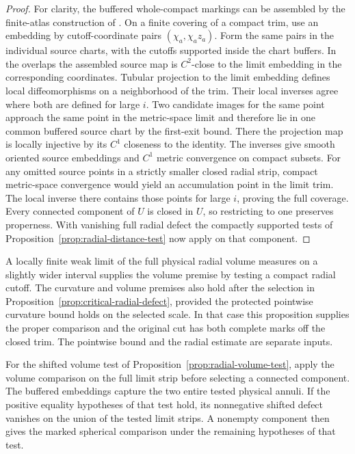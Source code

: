 \begin{proof}
For clarity, the buffered whole-compact markings can be assembled
by the finite-atlas construction of
\cite[Theorem~3.1 and its proof]{BelegradekKapovitch2000Finiteness}.
On a finite covering of a compact trim, use an embedding by
cutoff-coordinate pairs \((\chi_a,\chi_a z_a)\). Form the same pairs
in the individual source charts, with the cutoffs supported inside
the chart buffers. In the overlaps the assembled source map is
\(C^2\)-close to the limit embedding in the corresponding
coordinates. Tubular projection to the limit embedding defines
local diffeomorphisms on a neighborhood of the trim. Their local
inverses agree where both are defined for large \(i\). Two candidate
images for the same point approach the same point in the metric-space
limit and therefore lie in one common buffered source chart by the
first-exit bound. There the projection map is locally injective by
its \(C^1\) closeness to the identity. The inverses give smooth
oriented source embeddings and \(C^1\) metric convergence on compact
subsets. For any omitted source points in a strictly smaller closed
radial strip, compact metric-space convergence would yield an
accumulation point in the limit trim. The local inverse there
contains those points for large \(i\), proving the full coverage.
Every connected component of \(U\) is closed in \(U\), so restricting
to one preserves properness. With vanishing full radial defect the
compactly supported tests of Proposition~\ref{prop:radial-distance-test}
now apply on that component.
\end{proof}

A locally finite weak limit of the full physical radial volume
measures on a slightly wider interval supplies the volume premise
by testing a compact radial cutoff. The curvature and volume premises
also hold after the selection in
Proposition~\ref{prop:critical-radial-defect}, provided the protected
pointwise curvature bound holds on the selected scale. In that case
this proposition supplies the proper comparison and the original
cut has both complete marks off the closed trim. The pointwise bound
and the radial estimate are separate inputs.

For the shifted volume test of
Proposition~\ref{prop:radial-volume-test}, apply the volume comparison
on the full limit strip before selecting a connected component.
The buffered embeddings capture the two entire tested physical
annuli. If the positive equality hypotheses of that test hold,
its nonnegative shifted defect vanishes on the union of the tested
limit strips. A nonempty component then gives the marked spherical
comparison under the remaining hypotheses of that test.
